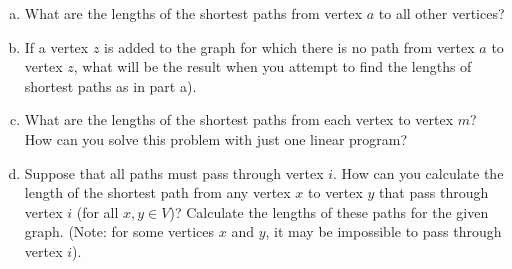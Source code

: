 \documentclass[../main.tex]{subfiles}
\begin{document}
\begin{enumerate}[a)]
	\item What are the lengths of the shortest paths from vertex $a$ to all other vertices?

	\item If a vertex $z$ is added to the graph for which there is no path from vertex $a$ to vertex $z$, what will be the result when you attempt to find the lengths of shortest paths as in part a).

	\item What are the lengths of the shortest paths from each vertex to vertex $m$? How can you solve this problem with just one linear program?

	\item Suppose that all paths must pass through vertex $i$. How can you calculate the length of the shortest path from any vertex $x$ to vertex $y$ that pass through vertex $i$ (for all $x, y \in V$)? Calculate the lengths of these paths for the given graph. (Note: for some vertices $x$ and $y$, it may be impossible to pass through vertex $i$).
\end{enumerate}
\end{document}
